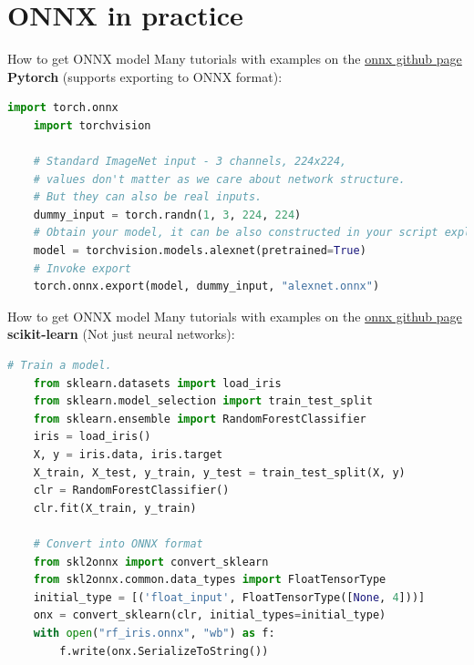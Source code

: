 \documentclass[aspectratio=169,9pt]{beamer}
\begin{document}
\section{ONNX in practice}
\begin{frame}[t,fragile]{How to get ONNX model}
  Many tutorials with examples on the \href{https://github.com/onnx/tutorials\#converting-to-onnx-format}{\color{blue}onnx github page}\\
  \vspace*{1em}
  \textbf{Pytorch} (supports exporting to ONNX format):
  \begin{lstlisting}[language=Python]
    import torch.onnx
    import torchvision
    
    # Standard ImageNet input - 3 channels, 224x224,
    # values don't matter as we care about network structure.
    # But they can also be real inputs.
    dummy_input = torch.randn(1, 3, 224, 224)
    # Obtain your model, it can be also constructed in your script explicitly
    model = torchvision.models.alexnet(pretrained=True)
    # Invoke export
    torch.onnx.export(model, dummy_input, "alexnet.onnx")    
  \end{lstlisting}
\end{frame}


\begin{frame}[t,fragile]{How to get ONNX model}
  Many tutorials with examples on the \href{https://github.com/onnx/tutorials\#converting-to-onnx-format}{\color{blue}onnx github page}\\
  \vspace*{1em}
  \textbf{scikit-learn} (Not just neural networks):
  \begin{lstlisting}[language=Python]
    # Train a model.
    from sklearn.datasets import load_iris
    from sklearn.model_selection import train_test_split
    from sklearn.ensemble import RandomForestClassifier
    iris = load_iris()
    X, y = iris.data, iris.target
    X_train, X_test, y_train, y_test = train_test_split(X, y)
    clr = RandomForestClassifier()
    clr.fit(X_train, y_train)
    
    # Convert into ONNX format
    from skl2onnx import convert_sklearn
    from skl2onnx.common.data_types import FloatTensorType
    initial_type = [('float_input', FloatTensorType([None, 4]))]
    onx = convert_sklearn(clr, initial_types=initial_type)
    with open("rf_iris.onnx", "wb") as f:
        f.write(onx.SerializeToString())
  \end{lstlisting}
\end{frame}
\end{document}
